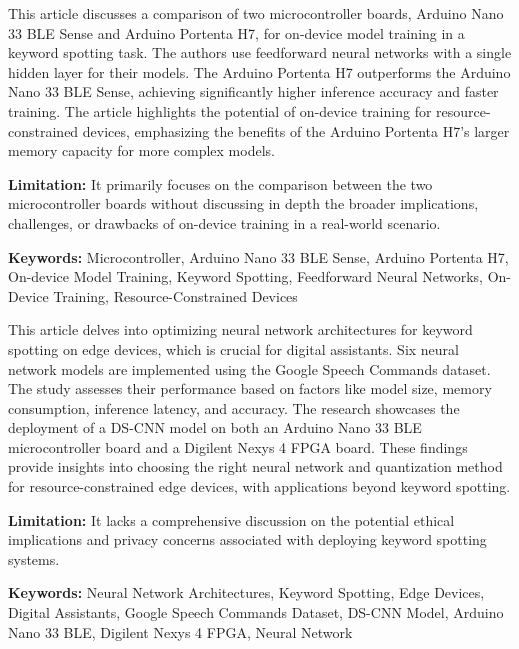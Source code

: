 { 
	This article \cite{Gimenez:2022b} discusses a comparison of two microcontroller boards, Arduino Nano 33 BLE Sense and Arduino Portenta H7, for on-device model training in a keyword spotting task. The authors use feedforward neural networks with a single hidden layer for their models. The Arduino Portenta H7 outperforms the Arduino Nano 33 BLE Sense, achieving significantly higher inference accuracy and faster training. The article highlights the potential of on-device training for resource-constrained devices, emphasizing the benefits of the Arduino Portenta H7's larger memory capacity for more complex models. 
	
	\bigskip
	
	\textbf{Limitation:} It primarily focuses on the comparison between the two microcontroller boards without discussing in depth the broader implications, challenges, or drawbacks of on-device training in a real-world scenario.
	
	\scriptsize{\textbf{Keywords:} Microcontroller, Arduino Nano 33 BLE Sense, Arduino Portenta H7, On-device Model Training, Keyword Spotting, Feedforward Neural Networks, On-Device Training, Resource-Constrained Devices}
}


{ 
	This article \cite{Bushur:2023} delves into optimizing neural network architectures for keyword spotting on edge devices, which is crucial for digital assistants. Six neural network models are implemented using the Google Speech Commands dataset. The study assesses their performance based on factors like model size, memory consumption, inference latency, and accuracy. The research showcases the deployment of a DS-CNN model on both an Arduino Nano 33 BLE microcontroller board and a Digilent Nexys 4 FPGA board. These findings provide insights into choosing the right neural network and quantization method for resource-constrained edge devices, with applications beyond keyword spotting.
	
	\bigskip
	
	\textbf{Limitation:} It lacks a comprehensive discussion on the potential ethical implications and privacy concerns associated with deploying keyword spotting systems.
	
	\scriptsize{\textbf{Keywords:} Neural Network Architectures, Keyword Spotting, Edge Devices, Digital Assistants,  Google Speech Commands Dataset,  DS-CNN Model, Arduino Nano 33 BLE, Digilent Nexys 4 FPGA, Neural Network}
}


